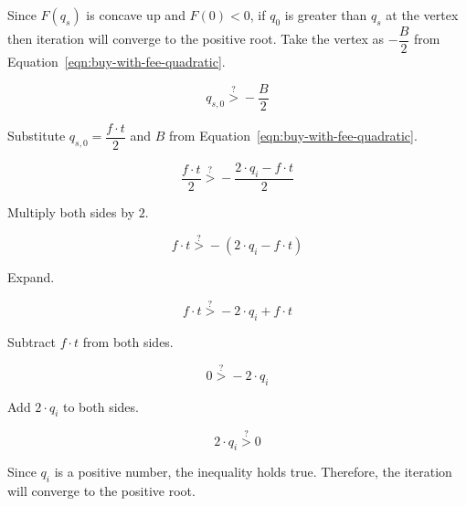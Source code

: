 Since $F(q_s)$ is concave up and $F(0) < 0$, if $q_0$ is greater than $q_s$ at the
vertex then iteration will converge to the positive root. Take the vertex as
$-\dfrac{B}{2}$ from Equation~\ref{eqn:buy-with-fee-quadratic}.

\begin{equation*}
	q_{s, 0} \stackrel{?}{>} - \frac{B}{2}
\end{equation*}

Substitute $q_{s, 0} = \dfrac{f \cdot t}{2}$ and $B$ from
Equation~\ref{eqn:buy-with-fee-quadratic}.

\begin{equation*}
	\frac{f \cdot t}{2} \stackrel{?}{>} - \frac{2 \cdot q_i - f \cdot t}{2}
\end{equation*}

Multiply both sides by $2$.

\begin{equation*}
	f \cdot t \stackrel{?}{>} - (2 \cdot q_i - f \cdot t)
\end{equation*}

Expand.

\begin{equation*}
	f \cdot t \stackrel{?}{>} -2 \cdot q_i + f \cdot t
\end{equation*}

Subtract $f \cdot t$ from both sides.

\begin{equation*}
	0 \stackrel{?}{>} -2 \cdot q_i
\end{equation*}

Add $2 \cdot q_i$ to both sides.

\begin{equation*}
	2 \cdot q_i \stackrel{?}{>} 0
\end{equation*}

Since $q_i$ is a positive number, the inequality holds true. Therefore, the iteration
will converge to the positive root.
